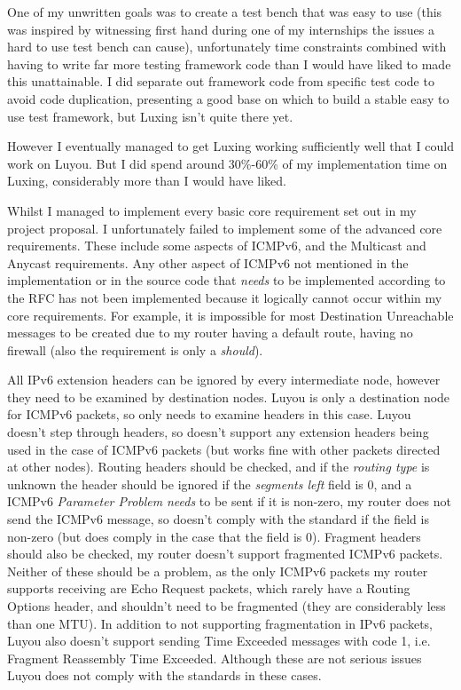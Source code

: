 \documentclass[12pt,a4paper,twoside,openright]{report}
\begin{document}
One of my unwritten goals was to create a test bench that was easy to use (this was inspired by witnessing first hand during one of my internships the issues a hard to use test bench can cause), unfortunately time constraints combined with having to write far more testing framework code than I would have liked to made this unattainable.  I did separate out framework code from specific test code to avoid code duplication, presenting a good base on which to build a stable easy to use test framework, but Luxing isn't quite there yet. 

However I eventually managed to get Luxing working sufficiently well that I could work on Luyou. But I did spend around 30\%-60\% of my implementation time on Luxing, considerably more than I would have liked.

\bigskip

Whilst I managed to implement every basic core requirement set out in my project proposal. I unfortunately failed to implement some of the advanced core requirements. These include some aspects of ICMPv6, and the Multicast and Anycast requirements. Any other aspect of ICMPv6 not mentioned in the implementation or in the source code that \textit{needs} to be implemented according to the RFC has not been implemented because it logically cannot occur within my core requirements.  For example, it is impossible for most Destination Unreachable messages to be created due to my router having a default route, having no firewall (also the requirement is only a \textit{should}).

\bigskip

All IPv6 extension headers can be ignored by every intermediate node, however they need to be examined by destination nodes.  Luyou is only a destination node for ICMPv6  packets, so only needs to examine headers in this case. Luyou doesn't step through headers, so doesn't support any extension headers being used in the case of ICMPv6 packets (but works fine with other packets directed at other nodes). Routing headers should be checked, and if the \textit{routing type} is unknown the header should be ignored if the \textit{segments left} field is 0, and a ICMPv6 \textit{Parameter Problem} \textit{needs} to be sent if it is non-zero, my router does not send the ICMPv6 message, so doesn't comply with the standard if the field is non-zero (but does comply in the case that the field is 0). Fragment headers should also be checked, my router doesn't support fragmented ICMPv6 packets.  Neither of these should be a problem, as the only ICMPv6 packets my router supports receiving are Echo Request packets, which rarely have a Routing Options header, and shouldn't need to be fragmented (they are considerably less than one MTU). In addition to not supporting fragmentation in IPv6 packets, Luyou also doesn't support sending Time Exceeded messages with code 1, i.e. Fragment Reassembly Time Exceeded. Although these are not serious issues Luyou does not comply with the standards in these cases.
\end{document}
